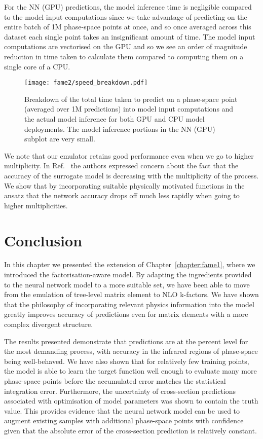 \documentclass[main.tex]{subfiles}
\begin{document}
For the NN (GPU) predictions, the model inference time is negligible
compared to the model input computations since we take advantage
of predicting on the entire batch of 1M phase-space points at once,
and so once averaged across this dataset each single point takes
an insignificant amount of time.
The model input computations are vectorised on the GPU and so we see
an order of magnitude reduction in time taken to calculate them compared
to computing them on a single core of a CPU.

\begin{figure}
    \centering
    \texttt{[image: fame2/speed\_breakdown.pdf]}
    \caption{Breakdown of the total time taken to predict on a phase-space
    point (averaged over 1M predictions) into model input
    computations and the actual model inference for both GPU and CPU
    model deployments. The model inference
    portions in the NN (GPU) subplot are very small.}
    \label{fig:1L_speed_breakdown}
\end{figure}

We note that our emulator retains good performance even
when we go to higher multiplicity. In Ref.~\cite{Badger:2022hwf}
the authors %
expressed concern about the fact that the accuracy of the surrogate model
is decreasing with the multiplicity of the process.
We show that by incorporating suitable physically motivated
functions in the ansatz that the network accuracy drops off much less
rapidly when going to higher multiplicities.

\section{Conclusion}\label{sec:1L_conclusion}
In this chapter we presented the extension of Chapter~\ref{chapter:fame1},
where we introduced the factorisation-aware model. By adapting the ingredients
provided to the neural network model to a more suitable set,
we have been able to move from the emulation of tree-level matrix element to
NLO k-factors.
We have shown that the philosophy of incorporating
relevant physics information into the model greatly improves accuracy
of predictions even for matrix elements with a more complex
divergent structure.

The results presented demonstrate that predictions are at the
percent level for the most demanding process, with accuracy in the infrared regions
of phase-space being well-behaved. We have also shown
that for relatively few training points, the model is able to learn
the target function well enough to evaluate many more phase-space points
before the accumulated error matches the statistical integration error.
Furthermore, the uncertainty of cross-section predictions
associated with optimisation of model parameters
was shown to contain the truth value. This provides evidence that
the neural network model can be used to augment existing samples
with additional phase-space points with confidence given that the
absolute error of the cross-section prediction is relatively constant.
\end{document}
